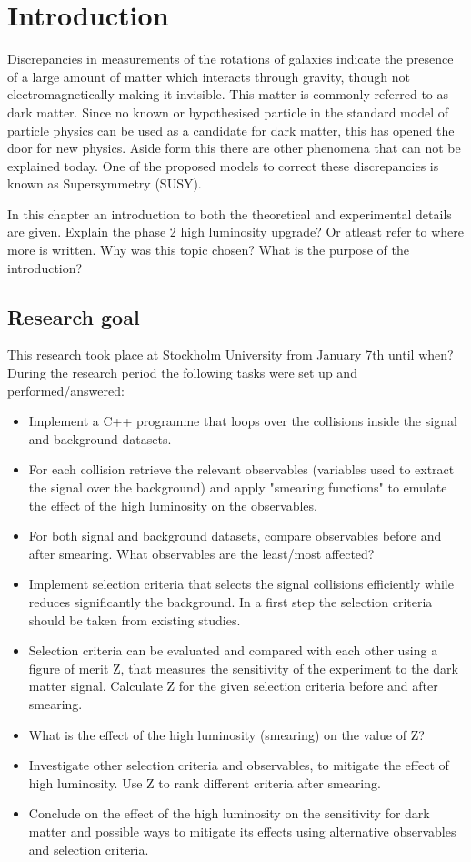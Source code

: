 \chapter{Introduction}\label{cha:intro}
Discrepancies in measurements of the rotations of galaxies indicate the presence of a large amount of matter which interacts through gravity, though not electromagnetically making it invisible. This matter is commonly referred to as dark matter. Since no known or hypothesised particle in the standard model of particle physics can be used as a candidate for dark matter, this has opened the door for new physics. Aside form this there are other phenomena that can not be explained today. One of the proposed models to correct these discrepancies is known as Supersymmetry (SUSY).  


In this chapter an introduction to both the theoretical and experimental details are given. 
Explain the phase 2 high luminosity upgrade? Or atleast refer to where more is written.
Why was this topic chosen? What is the purpose of the introduction?

\newpage
\section{Research goal}\label{sec:goal}
This research took place at Stockholm University from January 7th until when?
During the research period the following tasks were set up and performed/answered:
\begin{itemize}
\item Implement a C++ programme that loops over the collisions inside the signal and background datasets.	
\item For each collision retrieve the relevant observables (variables used to	 extract the signal over the background) and apply "smearing functions" to emulate the effect of the high luminosity on the observables. 	
\item For both signal and background datasets, compare observables before and after smearing. What observables are the least/most affected?	
\item Implement selection criteria that selects the signal collisions efficiently while reduces significantly the background. In a first step the selection criteria should be taken from existing studies.
\item Selection criteria can be evaluated and compared with each other using a figure of merit Z, that measures the sensitivity of the experiment to the	 dark matter signal. Calculate Z for the given selection criteria before and after smearing.
\item What is the effect of the high luminosity (smearing) on the value of Z?
\item Investigate other selection criteria and observables, to mitigate the effect of high luminosity. Use Z to rank different criteria after smearing.
\item Conclude on the effect of the high luminosity on the sensitivity for dark matter and possible ways to mitigate its effects using alternative observables and selection criteria. 
\end{itemize}
\newpage
